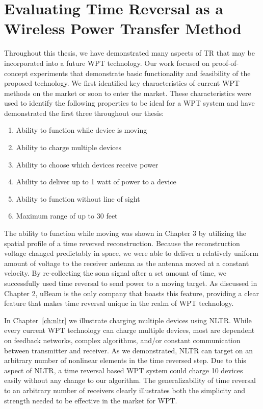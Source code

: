 \section{Evaluating Time Reversal as a Wireless Power Transfer Method}

Throughout this thesis, we have demonstrated many aspects of TR that may be incorporated into a future WPT technology. Our work focused on proof-of-concept experiments that demonstrate basic functionality and feasibility of the proposed technology.  We first identified key characteristics of current WPT methods on the market or soon to enter the market. These characteristics were used to identify the following properties to be ideal for a WPT system and have demonstrated the first three throughout our thesis:

\begin{enumerate}
\item Ability to function while device is moving
\item Ability to charge multiple devices
\item Ability to choose which devices receive power
\item Ability to deliver up to 1 watt of power to a device
\item Ability to function without line of sight
\item Maximum range of up to 30 feet
\end{enumerate}

The ability to function while moving was shown in Chapter 3 by utilizing the spatial profile of a time reversed reconstruction. Because the reconstruction voltage changed predictably in space, we were able to deliver a relatively uniform amount of voltage to the receiver antenna as the antenna moved at a constant velocity. By re-collecting the sona signal after a set amount of time, we successfully used time reversal to send power to a moving target.  As discussed in Chapter 2, uBeam is the only company that boasts this feature, providing a clear feature that makes time reversal unique in the realm of WPT technology.

In Chapter~\ref{ch:nltr} we illustrate charging multiple devices using NLTR. While every current WPT technology can charge multiple devices, most are dependent on feedback networks, complex algorithms, and/or constant communication between transmitter and receiver. As we demonstrated, NLTR can target on an arbitrary number of nonlinear elements in the time reversed step. Due to this aspect of NLTR, a time reversal based WPT system could charge 10 devices easily without any change to our algorithm. The generalizability of time reversal to an arbitrary number of receivers clearly illustrates both the simplicity and strength needed to be effective in the market for WPT.

